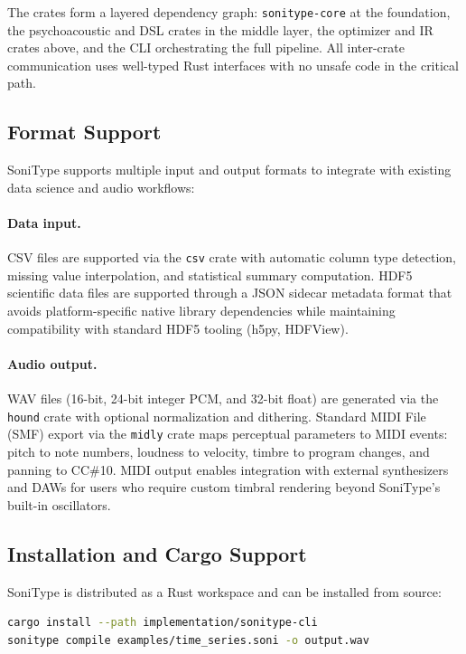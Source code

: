 \documentclass[sigchi, nonacm]{acmart}
\begin{document}
The crates form a layered dependency graph: \texttt{sonitype-core} at the foundation, the psychoacoustic and DSL crates in the middle layer, the optimizer and IR crates above, and the CLI orchestrating the full pipeline. All inter-crate communication uses well-typed Rust interfaces with no unsafe code in the critical path.

\subsection{Format Support}

SoniType supports multiple input and output formats to integrate with existing data science and audio workflows:

\paragraph{Data input.} CSV files are supported via the \texttt{csv} crate with automatic column type detection, missing value interpolation, and statistical summary computation. HDF5 scientific data files are supported through a JSON sidecar metadata format that avoids platform-specific native library dependencies while maintaining compatibility with standard HDF5 tooling (h5py, HDFView).

\paragraph{Audio output.} WAV files (16-bit, 24-bit integer PCM, and 32-bit float) are generated via the \texttt{hound} crate with optional normalization and dithering. Standard MIDI File (SMF) export via the \texttt{midly} crate maps perceptual parameters to MIDI events: pitch to note numbers, loudness to velocity, timbre to program changes, and panning to CC\#10. MIDI output enables integration with external synthesizers and DAWs for users who require custom timbral rendering beyond SoniType's built-in oscillators.

\subsection{Installation and Cargo Support}

SoniType is distributed as a Rust workspace and can be installed from source:

\begin{lstlisting}[language=bash, caption={Installation via Cargo.}]
cargo install --path implementation/sonitype-cli
sonitype compile examples/time_series.soni -o output.wav
\end{lstlisting}
\end{document}

